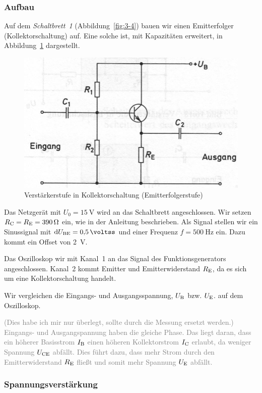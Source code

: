 \subsubsection{Aufbau}

Auf dem \emph{Schaltbrett~1} (Abbildung~\ref{fig:3-4}) bauen wir einen
Emitterfolger (Kollektorschaltung) auf. Eine solche ist, mit Kapazitäten
erweitert, in Abbildung~\ref{fig:beuth-bild-16-21} dargestellt.

\begin{figure}[htbp]
	\centering
	\includegraphics[width=.6\textwidth]{beuth-bild-16-21.jpg}
	\caption{%
		Verstärkerstufe in Kollektorschaltung (Emitterfolgerstufe)
		\cite[Bild~16.21]{beuth/elementare_elektronik}
	}
	\label{fig:beuth-bild-16-21}
\end{figure}

Das Netzgerät mit $U_0 = \SI{15}\volt$ wird an das Schaltbrett angeschlossen.
Wir setzen $R_\text{C} = R_\text{E} = \SI{390}\ohm$ ein, wie in der Anleitung beschrieben.
Als Signal stellen wir ein Sinussignal mit $\dif\UBE = \SI{.5}{\voltss}$ und
einer Frequenz $f = \SI{500}\hertz$ ein. Dazu kommt ein Offset von
\SI{2}{\volt}.

Das Oszilloskop wir mit Kanal~1 an das Signal des Funktionsgenerators
angeschlossen. Kanal~2 kommt Emitter und Emitterwiderstand $R_\text{E}$, da es sich um
eine Kollektorschaltung handelt.

Wir vergleichen die Eingangs- und Ausgangsspannung, $U_\text{B}$ bzw. $U_\text{E}$. auf dem
Oszilloskop.

\textcolor{gray}{
	(Dies habe ich mir nur überlegt, sollte durch die Messung ersetzt werden.)
	Eingangs- und Ausgangspannung haben die gleiche Phase. Das liegt daran,
	dass ein höherer Basisstrom $I_\text{B}$ einen höheren Kollektorstrom $I_\text{C}$
	erlaubt, da weniger Spannung $U_\text{CE}$ abfällt. Dies führt dazu, dass mehr
	Strom durch den Emitterwiderstand $R_\text{E}$ fließt und somit mehr Spannung
	$U_\text{E}$ abfällt.
}

\subsubsection{Spannungsverstärkung}

